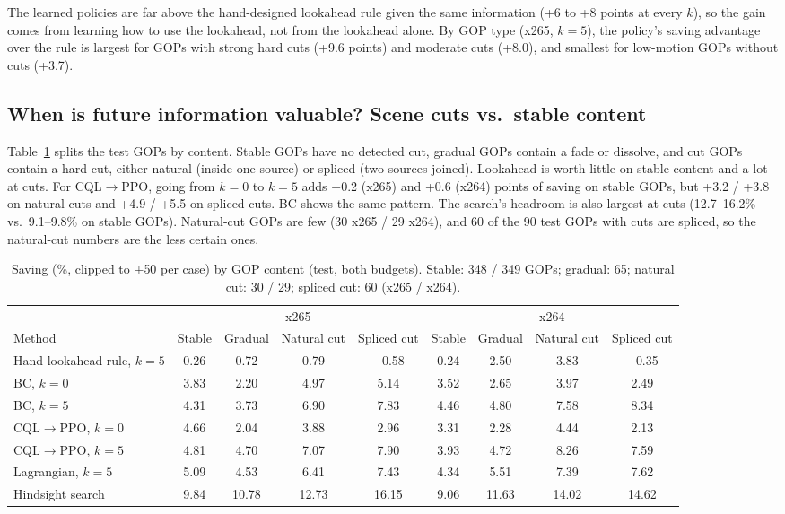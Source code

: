 \documentclass[conference]{IEEEtran}
\newcommand{\cqlppo}{CQL$\to$PPO}
\begin{document}
The learned policies are far above the hand-designed lookahead rule given the same information (+6 to +8 points at every $k$), so the gain comes from learning how to use the lookahead, not from the lookahead alone. By GOP type (x265, $k{=}5$), the policy's saving advantage over the rule is largest for GOPs with strong hard cuts (+9.6 points) and moderate cuts (+8.0), and smallest for low-motion GOPs without cuts (+3.7).

\subsection{When is future information valuable? Scene cuts vs.\ stable content}\label{sec:cuts}
Table~\ref{tab:cuts} splits the test GOPs by content. Stable GOPs have no detected cut, gradual GOPs contain a fade or dissolve, and cut GOPs contain a hard cut, either natural (inside one source) or spliced (two sources joined). Lookahead is worth little on stable content and a lot at cuts. For \cqlppo{}, going from $k{=}0$ to $k{=}5$ adds +0.2 (x265) and +0.6 (x264) points of saving on stable GOPs, but +3.2 / +3.8 on natural cuts and +4.9 / +5.5 on spliced cuts. BC shows the same pattern. The search's headroom is also largest at cuts (12.7--16.2\% vs.\ 9.1--9.8\% on stable GOPs). Natural-cut GOPs are few (30 x265 / 29 x264), and 60 of the 90 test GOPs with cuts are spliced, so the natural-cut numbers are the less certain ones.

\begin{table}[t]
\centering\footnotesize
\caption{Saving (\%, clipped to $\pm$50 per case) by GOP content (test, both budgets). Stable: 348 / 349 GOPs; gradual: 65; natural cut: 30 / 29; spliced cut: 60 (x265 / x264).}
\label{tab:cuts}
\setlength{\tabcolsep}{4pt}
\begin{tabular}{@{}lcccccccc@{}}
\toprule
& \multicolumn{4}{c}{x265} & \multicolumn{4}{c}{x264}\\
\cmidrule(lr){2-5}\cmidrule(l){6-9}
Method & Stable & Gradual & Natural cut & Spliced cut & Stable & Gradual & Natural cut & Spliced cut\\
\midrule
Hand lookahead rule, $k{=}5$ & 0.26 & 0.72 & 0.79 & $-$0.58 & 0.24 & 2.50 & 3.83 & $-$0.35\\
BC, $k{=}0$ & 3.83 & 2.20 & 4.97 & 5.14 & 3.52 & 2.65 & 3.97 & 2.49\\
BC, $k{=}5$ & 4.31 & 3.73 & 6.90 & 7.83 & 4.46 & 4.80 & 7.58 & 8.34\\
\cqlppo, $k{=}0$ & 4.66 & 2.04 & 3.88 & 2.96 & 3.31 & 2.28 & 4.44 & 2.13\\
\cqlppo, $k{=}5$ & 4.81 & 4.70 & 7.07 & 7.90 & 3.93 & 4.72 & 8.26 & 7.59\\
Lagrangian, $k{=}5$ & 5.09 & 4.53 & 6.41 & 7.43 & 4.34 & 5.51 & 7.39 & 7.62\\
\midrule
Hindsight search & 9.84 & 10.78 & 12.73 & 16.15 & 9.06 & 11.63 & 14.02 & 14.62\\
\bottomrule
\end{tabular}
\end{table}
\end{document}
